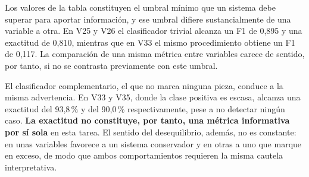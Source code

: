 \begin{table}[H]
    \centering
    \begingroup
    \small
    \endgroup
\end{table}

Los valores de la tabla constituyen el umbral mínimo que un sistema debe superar
para aportar información, y ese umbral difiere sustancialmente de una variable a
otra. En V25 y V26 el clasificador trivial alcanza un F1 de 0,895 y una exactitud
de 0,810, mientras que en V33 el mismo procedimiento obtiene un F1 de 0,117. La
comparación de una misma métrica entre variables carece de sentido, por tanto, si
no se contrasta previamente con este umbral.

El clasificador complementario, el que no marca ninguna pieza, conduce a la misma
advertencia. En V33 y V35, donde la clase positiva es escasa, alcanza una
exactitud del 93,8\,\% y del 90,0\,\% respectivamente, pese a no detectar ningún
caso. \textbf{La exactitud no constituye, por tanto, una métrica informativa por
sí sola} en esta tarea. El sentido del desequilibrio, además, no es constante: en
unas variables favorece a un sistema conservador y en otras a uno que marque en
exceso, de modo que ambos comportamientos requieren la misma cautela
interpretativa.

